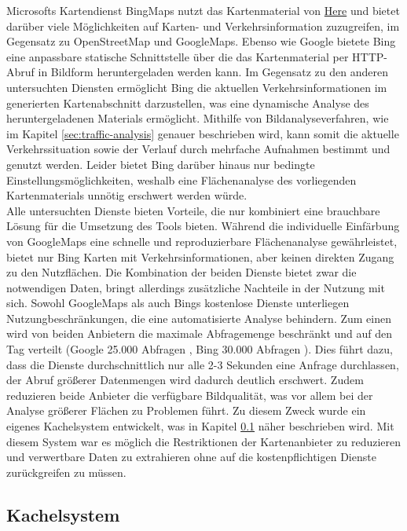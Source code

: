 Microsofts Kartendienst BingMaps nutzt das Kartenmaterial von \href{https://here.com/}{Here} und bietet darüber viele Möglichkeiten auf Karten- und Verkehrsinformation zuzugreifen, im Gegensatz zu OpenStreetMap und GoogleMaps. Ebenso wie Google bietete Bing eine anpassbare statische Schnittstelle \cite{bingstaticmap} über die das Kartenmaterial per HTTP-Abruf in Bildform heruntergeladen werden kann. Im Gegensatz zu den anderen untersuchten Diensten ermöglicht Bing die aktuellen Verkehrsinformationen im generierten Kartenabschnitt darzustellen, was eine dynamische Analyse des heruntergeladenen Materials ermöglicht. Mithilfe von Bildanalyseverfahren, wie im Kapitel \ref{sec:traffic-analysis} genauer beschrieben wird, kann somit die aktuelle Verkehrssituation sowie der Verlauf durch mehrfache Aufnahmen bestimmt und genutzt werden. Leider bietet Bing darüber hinaus nur bedingte Einstellungsmöglichkeiten, weshalb eine Flächenanalyse des vorliegenden Kartenmaterials unnötig erschwert werden würde.\\

Alle untersuchten Dienste bieten Vorteile, die nur kombiniert eine brauchbare Lösung für die Umsetzung des Tools bieten. Während die individuelle Einfärbung von GoogleMaps eine schnelle und reproduzierbare Flächenanalyse gewährleistet, bietet nur Bing Karten mit Verkehrsinformationen, aber keinen direkten Zugang zu den Nutzflächen. Die Kombination der beiden Dienste bietet zwar die notwendigen Daten, bringt allerdings zusätzliche Nachteile in der Nutzung mit sich. Sowohl GoogleMaps als auch Bings kostenlose Dienste unterliegen Nutzungbeschränkungen, die eine automatisierte Analyse behindern. Zum einen wird von beiden Anbietern die maximale Abfragemenge beschränkt und auf den Tag verteilt (Google 25.000 Abfragen \cite{googleusagelimits}, Bing 30.000 Abfragen \cite{bingusagelimits}). Dies führt dazu, dass die Dienste durchschnittlich nur alle 2-3 Sekunden eine Anfrage durchlassen, der Abruf größerer Datenmengen wird dadurch deutlich erschwert. Zudem reduzieren beide Anbieter die verfügbare Bildqualität, was vor allem bei der Analyse größerer Flächen zu Problemen führt. Zu diesem Zweck wurde ein eigenes Kachelsystem entwickelt, was in Kapitel \ref{sec:kachelsystem} näher beschrieben wird. Mit diesem System war es möglich die Restriktionen der Kartenanbieter zu reduzieren und verwertbare Daten zu extrahieren ohne auf die kostenpflichtigen Dienste zurückgreifen zu müssen.\\

\subsection{Kachelsystem}
\label{sec:kachelsystem}

